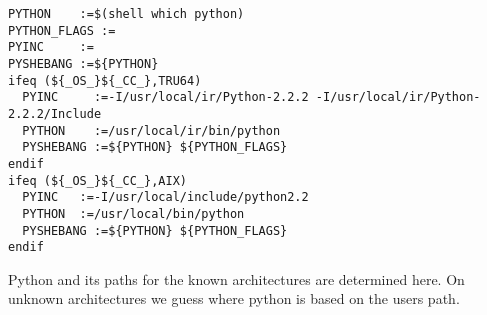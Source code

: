 \documentclass{article}
\begin{document}
\begin{verbatim}
PYTHON    :=$(shell which python)
PYTHON_FLAGS :=
PYINC     :=
PYSHEBANG :=${PYTHON}
ifeq (${_OS_}${_CC_},TRU64)
  PYINC     :=-I/usr/local/ir/Python-2.2.2 -I/usr/local/ir/Python-2.2.2/Include
  PYTHON    :=/usr/local/ir/bin/python
  PYSHEBANG :=${PYTHON} ${PYTHON_FLAGS}
endif
ifeq (${_OS_}${_CC_},AIX)
  PYINC   :=-I/usr/local/include/python2.2
  PYTHON  :=/usr/local/bin/python
  PYSHEBANG :=${PYTHON} ${PYTHON_FLAGS}
endif
\end{verbatim}
Python and its paths for the known architectures are determined here.  On
unknown architectures we guess where python is based on the users path.
\end{document}

